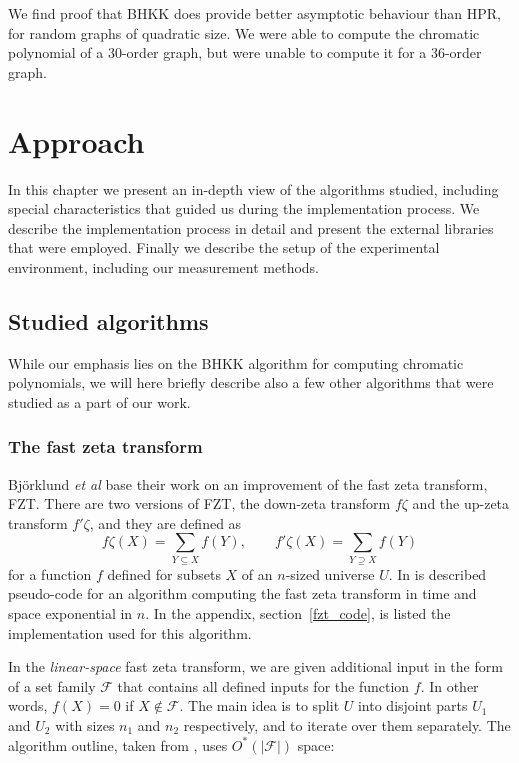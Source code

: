 \documentclass{cslthse-msc}
\begin{document}
We find proof that BHKK does provide better asymptotic behaviour than HPR, for random graphs of quadratic size. We were able to compute the chromatic polynomial of a 30-order graph, but were unable to compute it for a 36-order graph.

\chapter{Approach}
In this chapter we present an in-depth view of the algorithms studied, including special characteristics that guided us during the implementation process. We describe the implementation process in detail and present the external libraries that were employed. Finally we describe the setup of the experimental environment, including our measurement methods.


\section{Studied algorithms}
While our emphasis lies on the BHKK algorithm for computing chromatic polynomials, we will here briefly describe also a few other algorithms that were studied as a part of our work.

\subsection{The fast zeta transform}
Björklund \emph{et al} \cite{cov_pack} base their work on an improvement of the fast zeta transform, FZT. There are two versions of FZT, the down-zeta transform $f\zeta$ and the up-zeta transform $f'\zeta$, and they are defined as
\[
 f\zeta(X) = \sum_{Y \subseteq X} f(Y), \qquad f'\zeta(X) = \sum_{Y \supseteq X} f(Y)
\]
for a function $f$ defined for subsets $X$ of an $n$-sized universe $U$. In \cite[p.5]{cov_pack} is described pseudo-code for an algorithm computing the fast zeta transform in time and space exponential in $n$. In the appendix, section~\ref{fzt_code}, is listed the implementation used for this algorithm.

In the \emph{linear-space} fast zeta transform, we are given additional input in the form of a set family $\mathcal{F}$ that contains all defined inputs for the function $f$. In other words, $f(X) = 0$ if $X \notin \mathcal{F}$. The main idea is to split $U$ into disjoint parts $U_1$ and $U_2$ with sizes $n_1$ and $n_2$ respectively, and to iterate over them separately. The algorithm outline, taken from \cite[sec.3]{cov_pack}, uses $O^*(|\mathcal{F}|)$ space:
\end{document}
